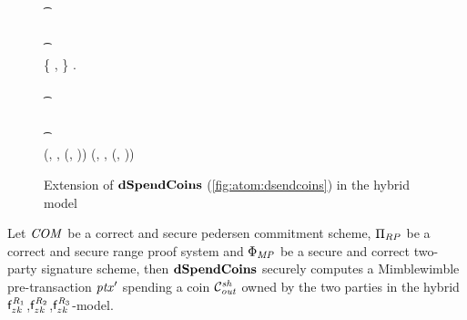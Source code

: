\begin{figure}
{\begin{varwidth}{\textwidth}
{        \color{blue} \pcif {}  \\
        \color{blue} \t \pcreturn \cnstFalsum \\
        \color{blue} \pcif {}  \\
        \color{blue} \t \pcreturn \cnstFalsum \\
        \{ \varPubKey, \varRand \} \opFunResult \funStarAlt{\varPreTx}.\varSigContext \\
        \color{blue} \pcif {}  \\
        \color{blue} \t \pcreturn \cnstFalsum \\
        \color{blue} \pcif {}  \\
        \color{blue} \t \pcreturn \cnstFalsum \\
        \pcreturn (\funStarAlt{\varPreTx}, \funStar{\varSpendableCoinAlice}, (\varSecKeyAlice, \varNonceAlice)) \< \< \pcreturn (\funStarAlt{\varPreTx}, \funStar{\varSpendableCoinCarol}, (\varSecKeyCarol, \varNonceCarol))
        }
    \end{varwidth}
    }
    \caption{Extension of $\mathbf{dSpendCoins}$ (\cref{fig:atom:dsendcoins}) in the hybrid model} \label{fig:atom:hybrid-dsend}
\end{figure}

\begin{theorem}
    \label{teo:atom:sec-dspend}
    Let $\mathit{COM}$ be a correct and secure pedersen commitment scheme, $\Pi_{RP}$ be a correct and secure range proof system and $\Phi_{\mathit{MP}}$ be a secure and correct two-party signature scheme, then $\mathbf{dSpendCoins}$ securely computes a Mimblewimble pre-transaction ${\mathit{ptx}}'$ spending a coin $\mathcal{C}_{\mathit{out}}^{\mathit{sh}}$ owned by the two parties in the hybrid $\mathsf{f}^{\mathit{R}_1}_{zk}$,$\mathsf{f}^{\mathit{R}_2}_{zk}$,$\mathsf{f}^{\mathit{R}_3}_{zk}$-model.
\end{theorem}

